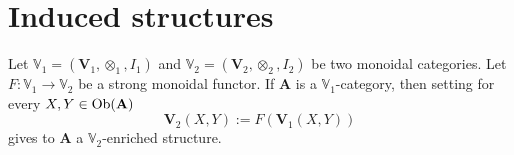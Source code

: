\section{Induced structures}

Let $\mathbb V_1 = (\mathbf V_1, \otimes_1, I_1)$ and $\mathbb V_2 = (\mathbf V_2, \otimes_2, I_2)$ be two monoidal categories. Let $F \colon \mathbb V_1 \to \mathbb V_2$ be a strong monoidal functor. If $\mathbf A$ is a $\mathbb V_1$-category, then setting for every $X,Y \in \mathrm{Ob}(\mathbf A)$
\[
\mathbf V_2(X,Y) := F(\mathbf V_1(X,Y))
\]
gives to $\mathbf A$ a $\mathbb V_2$-enriched structure.
